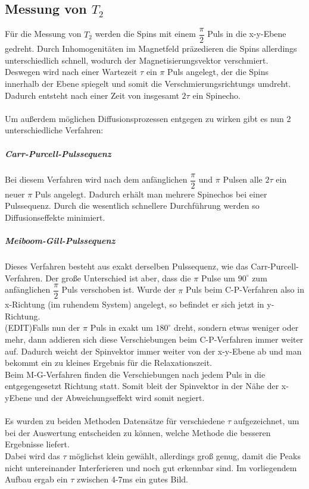 \documentclass[12pt,a4paper]{article}
\begin{document}
\subsection{Messung von $T_2$}

Für die Messung von $T_2$ werden die Spins mit einem  $\dfrac{\pi}{2}$ Puls in die x-y-Ebene gedreht. Durch Inhomogenitäten im Magnetfeld präzedieren die Spins allerdings unterschiedlich schnell, wodurch der Magnetisierungsvektor verschmiert. Deswegen wird nach einer Wartezeit $\tau$ ein $\pi$ Puls angelegt, der die Spins innerhalb der Ebene spiegelt und somit die Verschmierungsrichtungs umdreht. Dadurch entsteht nach einer Zeit von insgesamt $2 \tau$ ein Spinecho. \\ 
\\
Um außerdem möglichen Diffusionsprozessen entgegen zu wirken gibt es nun 2 unterschiedliche Verfahren:

\subparagraph{Carr-Purcell-Pulssequenz}
Bei diesem Verfahren wird nach dem anfänglichen $\dfrac{\pi}{2}$ und $\pi$ Pulsen alle  $2 \tau$ ein neuer $\pi$ Puls angelegt. Dadurch erhält man mehrere Spinechos bei einer Pulssequenz. Durch die wesentlich schnellere Durchführung werden so Diffusionseffekte minimiert.
\subparagraph{Meiboom-Gill-Pulssequenz}
Dieses Verfahren besteht aus exakt derselben Pulssequenz, wie das Carr-Purcell-Verfahren. Der große Unterschied ist aber, dass  die $\pi$ Pulse um $90^{\circ}$ zum anfänglichen $\dfrac{\pi}{2}$ Puls verschoben ist. Wurde der $\pi$ Puls beim C-P-Verfahren also in x-Richtung (im ruhendem System) angelegt, so befindet er sich jetzt in y-Richtung.\\
(EDIT)Falls nun der $\pi$ Puls in exakt um $180^{\circ}$ dreht, sondern etwas weniger oder mehr, dann addieren sich diese Verschiebungen beim C-P-Verfahren immer weiter auf. Dadurch weicht der Spinvektor immer weiter von der x-y-Ebene ab und man bekommt ein zu kleines Ergebnis für die Relaxationszeit.\\
Beim M-G-Verfahren finden die Verschiebungen nach jedem Puls in die entgegengesetzt Richtung statt. Somit bleit der Spinvektor in der Nähe der x-yEbene und der Abweichungseffekt wird somit negiert.\\
\\
Es wurden zu beiden Methoden Datensätze für verschiedene $\tau$ aufgezeichnet, um bei der Auswertung entscheiden zu können, welche Methode die besseren Ergebnisse liefert.\\
Dabei wird das $\tau$ möglichst klein gewählt, allerdings groß genug, damit die Peaks nicht untereinander Interferieren und noch gut erkennbar sind. Im vorliegendem Aufbau ergab ein $\tau$ zwischen 4-7ms ein gutes Bild.
\end{document}
